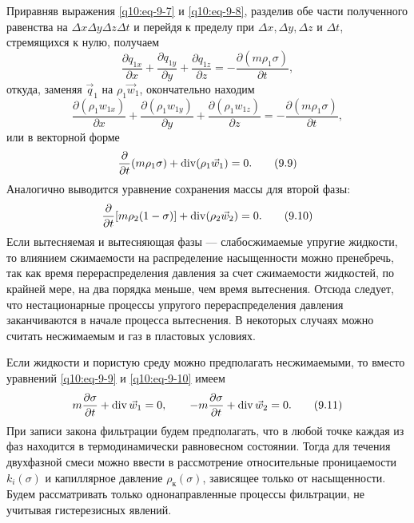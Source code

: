 Приравняв выражения \eqref{q10:eq-9-7} и \eqref{q10:eq-9-8}, разделив обе части полученного равенства на $\Delta x\Delta y\Delta z\Delta t$ и перейдя к пределу при $\Delta x,\Delta y,\Delta z$ и $\Delta t$, стремящихся к нулю, получаем
\[\frac{\partial q_{1x}}{\partial x}+\frac{\partial q_{1y}}{\partial y}+\frac{\partial q_{1z}}{\partial z}=-\frac{\partial(m\rho_1\sigma)}{\partial t},\]
откуда, заменяя $\vec q_1$ на $\rho_1\vec w_1$, окончательно находим
\[\frac{\partial(\rho_1w_{1x})}{\partial x}+\frac{\partial(\rho_1w_{1y})}{\partial y}+\frac{\partial(\rho_1w_{1z})}{\partial z}=-\frac{\partial(m\rho_1\sigma)}{\partial t},\]
или в векторной форме
\begin{equation}\frac{\partial}{\partial t}(m\rho_1\sigma)+\operatorname{div}(\rho_1\vec w_1)=0.\tag{9.9}\label{q10:eq-9-9}\end{equation}
Аналогично выводится уравнение сохранения массы для второй фазы:
\begin{equation}\frac{\partial}{\partial t}[m\rho_2(1-\sigma)]+\operatorname{div}(\rho_2\vec w_2)=0.\tag{9.10}\label{q10:eq-9-10}\end{equation}
Если вытесняемая и вытесняющая фазы --- слабосжимаемые упругие жидкости, то влиянием сжимаемости на распределение насыщенности можно пренебречь, так как время перераспределения давления за счет сжимаемости жидкостей, по крайней мере, на два порядка меньше, чем время вытеснения. Отсюда следует, что нестационарные процессы упругого перераспределения давления
заканчиваются в начале процесса вытеснения. В некоторых случаях можно считать несжимаемым и газ в пластовых условиях.

Если жидкости и пористую среду можно предполагать несжимаемыми, то вместо уравнений \eqref{q10:eq-9-9} и \eqref{q10:eq-9-10} имеем
\begin{equation}m\frac{\partial\sigma}{\partial t}+\operatorname{div}\vec w_1=0,\qquad-m\frac{\partial\sigma}{\partial t}+\operatorname{div}\vec w_2=0.\tag{9.11}\label{q10:eq-9-11}\end{equation}
При записи закона фильтрации будем предполагать, что в любой точке каждая из фаз находится в термодинамически равновесном состоянии. Тогда для течения двухфазной смеси можно ввести в рассмотрение относительные проницаемости $k_i(\sigma)$ и капиллярное давление $\rho_\text{к}(\sigma)$, зависящее только от насыщенности.
Будем рассматривать только однонаправленные процессы фильтрации, не учитывая гистерезисных явлений.

